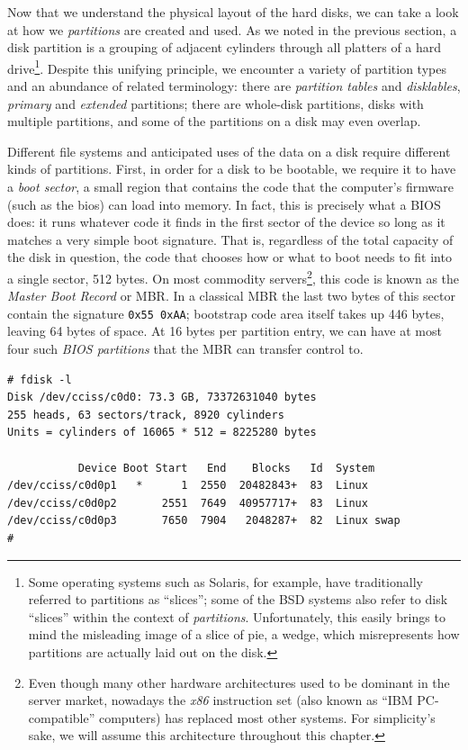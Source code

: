 Now that we understand the physical layout of the hard
disks, we can take a look at how we {\em partitions}
are created and used.  As we noted in the previous
section, a disk partition is a grouping of adjacent
cylinders through all platters of a hard
drive\footnote{Some operating systems such as Solaris,
for example, have traditionally referred to partitions
as ``slices''; some of the BSD systems also refer to
disk ``slices'' within the context of {\em
{} partitions}.  Unfortunately, this
easily brings to mind the misleading image of a slice
of pie, a wedge, which misrepresents how partitions
are actually laid out on the disk.}.  Despite this
unifying principle, we encounter a variety of
partition types and an abundance of related
terminology: there are {\em partition
tables} and {\em disklables},
{\em primary} and {\em
extended} partitions; there
are whole-disk partitions, disks with multiple
partitions, and some of the partitions on a disk may
even overlap.

Different file systems and anticipated uses of the
data on a disk require different kinds of partitions.
First, in order for a disk to be bootable, we require
it to have a {\em boot sector}, a
small region that contains the code that the
computer's firmware (such as the
\gls{bios}) can load into memory.  In
fact, this is precisely what a BIOS does: it runs
whatever code it finds in the first sector of the
device so long as it matches a very simple boot
signature.  That is, regardless
of the total capacity of the disk in question, the
code that chooses how or what to boot needs to fit
into a single sector, 512 bytes.  On most commodity
servers\footnote{Even though many other hardware
architectures used to be dominant in the server
market, nowadays the {\em x86} instruction set (also
known as ``IBM PC-compatible'' computers) has replaced
most other systems.  For simplicity's sake, we will
assume this architecture throughout this chapter.},
this code is known as the {\em Master Boot
Record} or MBR.
In a classical MBR the last two bytes of this sector
contain the signature {\tt 0x55 0xAA}; bootstrap code
area itself takes up 446 bytes, leaving 64 bytes of
space.  At 16 bytes per partition entry, we can have
at most four such {\em BIOS
partitions} that the MBR can
transfer control to.

\begin{lstlisting}[float,label=code:fdisk,caption=fdisk(8) sample invocation
and output on a Linux system]
# fdisk -l
Disk /dev/cciss/c0d0: 73.3 GB, 73372631040 bytes
255 heads, 63 sectors/track, 8920 cylinders
Units = cylinders of 16065 * 512 = 8225280 bytes

           Device Boot Start   End    Blocks   Id  System
/dev/cciss/c0d0p1   *      1  2550  20482843+  83  Linux
/dev/cciss/c0d0p2       2551  7649  40957717+  83  Linux
/dev/cciss/c0d0p3       7650  7904   2048287+  82  Linux swap
#
\end{lstlisting}

